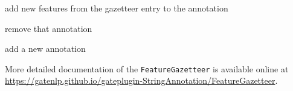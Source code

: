 \begin{plist}

\item{} add new features from the gazetteer entry to the annotation
\item{} remove that annotation
\item{} add a new annotation 

\end{plist}

More detailed documentation of the \texttt{FeatureGazetteer} is available online at 
\url{https://gatenlp.github.io/gateplugin-StringAnnotation/FeatureGazetteer}.


